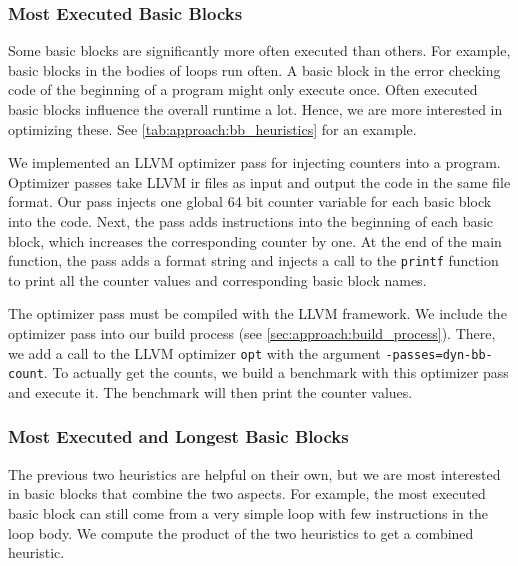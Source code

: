 \subsubsection{Most Executed Basic Blocks}
Some basic blocks are significantly more often executed than others.
For example, basic blocks in the bodies of loops run often.
A basic block in the error checking code of the beginning of a program might only execute once.
Often executed basic blocks influence the overall runtime a lot.
Hence, we are more interested in optimizing these.
See \cref{tab:approach:bb_heuristics} for an example.

We implemented an LLVM optimizer pass for injecting counters into a program.
Optimizer passes take LLVM \ac{ir} files as input and output the code in the same file format.
Our pass injects one global 64 bit counter variable for each basic block into the code.
Next, the pass adds instructions into the beginning of each basic block, which increases the corresponding counter by one.
At the end of the main function, the pass adds a format string and injects a call to the \lstinline{printf} function to print all the counter values and corresponding basic block names.

The optimizer pass must be compiled with the LLVM framework.
We include the optimizer pass into our build process (see \cref{sec:approach:build_process}).
There, we add a call to the LLVM optimizer \lstinline{opt} with the argument \mbox{\lstinline{-passes=dyn-bb-count}}.
To actually get the counts, we build a benchmark with this optimizer pass and execute it.
The benchmark will then print the counter values.

\subsubsection{Most Executed and Longest Basic Blocks}
The previous two heuristics are helpful on their own, but we are most interested in basic blocks that combine the two aspects.
For example, the most executed basic block can still come from a very simple loop with few instructions in the loop body.
We compute the product of the two heuristics to get a combined heuristic.

